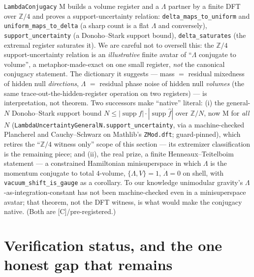 \documentclass[11pt]{article}
\newcommand{\Lam}{\Lambda}
\newcommand{\Kernel}{\textcolor{kcol}{\textsc{M}}}       %
\newcommand{\Conj}{\textcolor{ccol}{\textsc{[C]}}}        %
\newcommand{\lm}[1]{\texttt{#1}}
\begin{document}
\lm{LambdaConjugacy} \Kernel{} builds a volume register and a $\Lam$ partner by a
finite DFT over $\mathbb Z/4$ and proves a support-uncertainty relation:
\lm{delta\_maps\_to\_uniform} and \lm{uniform\_maps\_to\_delta} (a sharp count is a
flat $\Lam$ and conversely), \lm{support\_uncertainty} (a Donoho--Stark support
bound), \lm{delta\_saturates} (the extremal register saturates it).  We are careful
not to oversell this: the $\mathbb Z/4$ support-uncertainty relation is an
\emph{illustrative} finite avatar of ``$\Lam$ conjugate to volume'', a
metaphor-made-exact on one small register, \emph{not} the canonical conjugacy
statement.  The dictionary it suggests --- mass $=$ residual mixedness of hidden
null \emph{directions}, $\Lam$ $=$ residual phase noise of hidden null
\emph{volumes} (the same trace-out-the-hidden-register operation on two registers)
--- is interpretation, not theorem.  Two successors make ``native'' literal:
(i) the general-$N$ Donoho--Stark support bound
$N\le|\operatorname{supp}f|\cdot|\operatorname{supp}\widehat f|$ over $\mathbb Z/N$,
now \Kernel{} for \emph{all} $N$ (\lm{LambdaUncertaintyGeneralN.support\_uncertainty},
via a machine-checked Plancherel and Cauchy--Schwarz on Mathlib's \lm{ZMod.dft};
guard-pinned), which retires the ``$\mathbb Z/4$ witness only'' scope of this
section --- its extremizer classification is the remaining piece; and (ii), the
real prize, a finite Henneaux--Teitelboim statement --- a constrained Hamiltonian minisuperspace in
which $\Lam$ is the momentum conjugate to total $4$-volume, $\{\Lam,V\}=1$,
$\dot\Lam=0$ on shell, with \lm{vacuum\_shift\_is\_gauge} as a corollary.  To our
knowledge unimodular gravity's $\Lam$-as-integration-constant has not been
machine-checked even in a minisuperspace avatar; that theorem, not the DFT witness,
is what would make the conjugacy native.  (Both are \Conj{}/pre-registered.)

\section{Verification status, and the one honest gap that remains}
\end{document}
